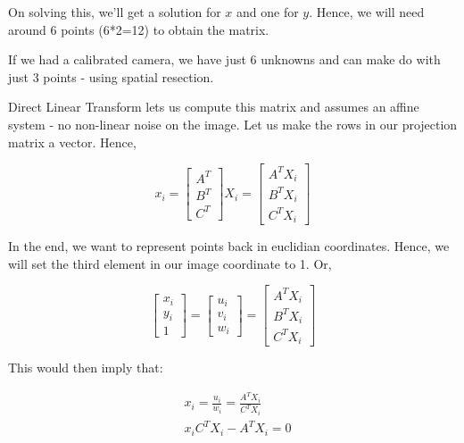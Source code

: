 On solving this, we'll get a solution for $x$ and one for $y$. Hence, we will need around 6 points (6*2=12) to obtain the matrix.

If we had a calibrated camera, we have just 6 unknowns and can make do with just 3 points - using spatial resection.

Direct Linear Transform lets us compute this matrix and assumes an affine system - no non-linear noise on the image. Let us make the rows in our projection matrix a vector. Hence,

\begin{equation}
    x_i = \begin{bmatrix}
    A^T\\
    B^T\\
    C^T
    \end{bmatrix}X_i = \begin{bmatrix}
    A^TX_i\\
    B^TX_i\\
    C^TX_i
    \end{bmatrix}
\end{equation}

In the end, we want to represent points back in euclidian coordinates. Hence, we will set the third element in our image coordinate to 1. Or,

\begin{equation*}
    \begin{bmatrix}
    x_i \\
    y_i \\
    1
    \end{bmatrix} = \begin{bmatrix}
    u_i \\
    v_i \\
    w_i
    \end{bmatrix} = \begin{bmatrix}
    A^TX_i\\
    B^TX_i\\
    C^TX_i
    \end{bmatrix}
\end{equation*}

This would then imply that:

\begin{equation}
\begin{split}
    &x_i = \frac{u_i}{w_i} = \frac{A^TX_i}{C^TX_i} \\
    &x_iC^TX_i - A^TX_i = 0
\end{split}
\end{equation}

